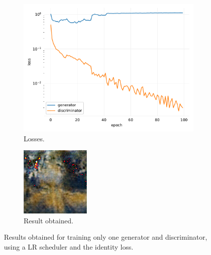 \documentclass[twocolumn,superscriptaddress,aps,floatfix, nofootinbib]{revtex4-1}
\begin{document}
    \begin{figure}[H]
        \centering
        \begin{subfigure}[b]{0.22\textwidth}
            \centering
            \includegraphics[width=\textwidth]{resources/png/gan-losses/onemodid.pdf}
            \caption{Losses.}
        \end{subfigure}
        \hfill
        \begin{subfigure}[b]{0.22\textwidth}
            \centering
            \includegraphics[width=\textwidth]{resources/png/gan-results/onemodid.png}
            \caption{Result obtained.}
            \label{fig:one2}
        \end{subfigure}
        \caption{Results obtained for training only one generator and discriminator, using a LR scheduler and the identity loss.}
    \end{figure}
    
\end{document}
